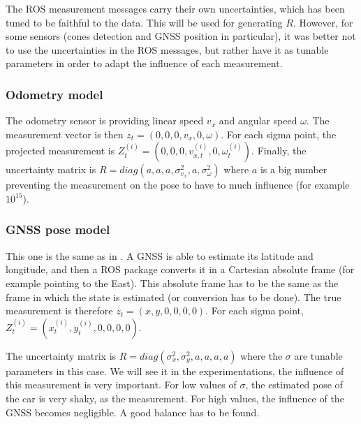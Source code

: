\documentclass[10pt,a4paper, twocolumn]{article}
\begin{document}
The ROS measurement messages carry their own uncertainties, which has been tuned to be faithful to the data. This will be used for generating $R$. However, for some sensors (cones detection and GNSS position in particular), it was better not to use the uncertainties in the ROS messages, but rather have it as tunable parameters in order to adapt the influence of each measurement.

\subsubsection{Odometry model}
The odometry sensor is providing linear speed $v_x$ and angular speed $\omega$. The measurement vector is then $z_t = (0, 0, 0, v_x, 0, \omega)$. For each sigma point, the projected measurement is $Z_t^{(i)} = (0, 0, 0, v_{x, t}^{(i)}, 0, \omega_t^{(i)})$. Finally, the uncertainty matrix is $R = diag(a, a, a, \sigma_{v_x}^2, a, \sigma_\omega^2)$ where $a$ is a big number preventing the measurement on the pose to have to much influence (for example $10^{15}$).

\subsubsection{GNSS pose model}
This one is the same as in \cite{RobustVehicleLocalization}. A GNSS is able to estimate its latitude and longitude, and then a ROS package converts it in a Cartesian absolute frame (for example pointing to the East). This absolute frame has to be the same as the frame in which the state is estimated (or conversion has to be done). The true measurement is therefore $z_t = (x, y, 0, 0, 0, 0)$. For each sigma point, $Z_t^{(i)} = (x_t^{(i)}, y_t^{(i)}, 0, 0, 0, 0)$.

The uncertainty matrix is $R = diag(\sigma_x^2, \sigma_y^2, a, a, a, a)$ where the $\sigma$ are tunable parameters in this case. We will see it in the experimentations, the influence of this measurement is very important. For low values of $\sigma$, the estimated pose of the car is very shaky, as the measurement. For high values, the influence of the GNSS becomes negligible. A good balance has to be found.
\end{document}
